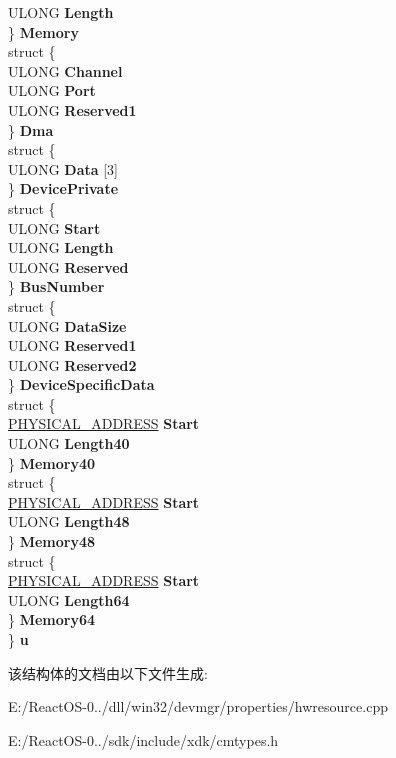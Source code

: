 \begin{DoxyCompactItemize}
\begin{tabbing}
\>\>ULONG {\bfseries Length}\\
\>\} {\bfseries Memory}\\
\>struct \{\\
\>\>ULONG {\bfseries Channel}\\
\>\>ULONG {\bfseries Port}\\
\>\>ULONG {\bfseries Reserved1}\\
\>\} {\bfseries Dma}\\
\>struct \{\\
\>\>ULONG {\bfseries Data} \mbox{[}3\mbox{]}\\
\>\} {\bfseries DevicePrivate}\\
\>struct \{\\
\>\>ULONG {\bfseries Start}\\
\>\>ULONG {\bfseries Length}\\
\>\>ULONG {\bfseries Reserved}\\
\>\} {\bfseries BusNumber}\\
\>struct \{\\
\>\>ULONG {\bfseries DataSize}\\
\>\>ULONG {\bfseries Reserved1}\\
\>\>ULONG {\bfseries Reserved2}\\
\>\} {\bfseries DeviceSpecificData}\\
\>struct \{\\
\>\>\hyperlink{union___l_a_r_g_e___i_n_t_e_g_e_r}{PHYSICAL\_ADDRESS} {\bfseries Start}\\
\>\>ULONG {\bfseries Length40}\\
\>\} {\bfseries Memory40}\\
\>struct \{\\
\>\>\hyperlink{union___l_a_r_g_e___i_n_t_e_g_e_r}{PHYSICAL\_ADDRESS} {\bfseries Start}\\
\>\>ULONG {\bfseries Length48}\\
\>\} {\bfseries Memory48}\\
\>struct \{\\
\>\>\hyperlink{union___l_a_r_g_e___i_n_t_e_g_e_r}{PHYSICAL\_ADDRESS} {\bfseries Start}\\
\>\>ULONG {\bfseries Length64}\\
\>\} {\bfseries Memory64}\\
\} {\bfseries u}\\

\end{tabbing}\end{DoxyCompactItemize}


该结构体的文档由以下文件生成\+:\begin{DoxyCompactItemize}
\item 
E\+:/\+React\+O\+S-\/0../dll/win32/devmgr/properties/hwresource.\+cpp\item 
E\+:/\+React\+O\+S-\/0../sdk/include/xdk/cmtypes.\+h\end{DoxyCompactItemize}
